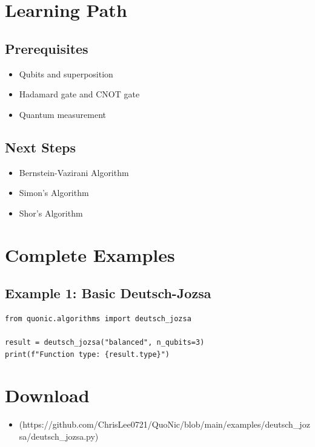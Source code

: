 \documentclass[12pt,a4paper]{article}
\begin{document}
\section{Learning Path}

\subsection{Prerequisites}
\begin{itemize}
  \item Qubits and superposition
  \item Hadamard gate and CNOT gate
  \item Quantum measurement
\end{itemize}

\subsection{Next Steps}
\begin{itemize}
  \item Bernstein-Vazirani Algorithm
  \item Simon's Algorithm
  \item Shor's Algorithm
\end{itemize}

\section{Complete Examples}

\subsection{Example 1: Basic Deutsch-Jozsa}

\begin{verbatim}
from quonic.algorithms import deutsch_jozsa

result = deutsch_jozsa("balanced", n_qubits=3)
print(f"Function type: {result.type}")
\end{verbatim}

\section{Download}

\begin{itemize}
  \item [deutsch\_jozsa.py](https://github.com/ChrisLee0721/QuoNic/blob/main/examples/deutsch_jozsa/deutsch_jozsa.py)
\end{itemize}
\end{document}
